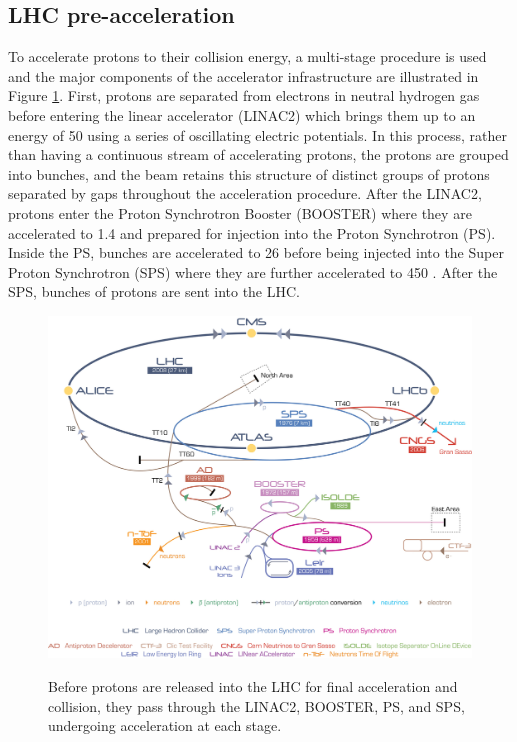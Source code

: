\subsection{LHC pre-acceleration}
To accelerate protons to their collision energy,
 a multi-stage procedure is used and 
 the major components of the accelerator infrastructure
 are illustrated in Figure \ref{fig:lhc_complex}.
First, protons are separated from
 electrons in neutral hydrogen gas before
 entering the linear accelerator (LINAC2)
 which brings them up to an energy of 50 \MeV
 using a series of oscillating electric potentials.
In this process, rather than having a continuous 
 stream of accelerating protons, the protons
 are grouped into bunches, and the beam
 retains this structure
 of distinct groups of protons separated by gaps
 throughout the acceleration procedure.
After the LINAC2, protons enter the Proton
 Synchrotron Booster (BOOSTER) where
 they are accelerated to 1.4 \GeV and 
 prepared for injection into the Proton Synchrotron (PS).
Inside the PS, bunches are accelerated to
 26 \GeV before being injected into the
 Super Proton Synchrotron (SPS) where they 
 are further accelerated to 450 \GeV.
After the SPS, bunches of protons are sent into
 the LHC.

\begin{figure}[tb]
\caption[The LCH accelerator complex at CERN]{
 Before protons are released into the LHC
  for final acceleration and collision, they pass through
  the LINAC2, BOOSTER, PS, and SPS, 
  undergoing acceleration %
  at each stage.
 }
\includegraphics[width=\textwidth]{pdfs/experiment/cern_accelerator_complex.jpg}
\label{fig:lhc_complex}
\end{figure}


